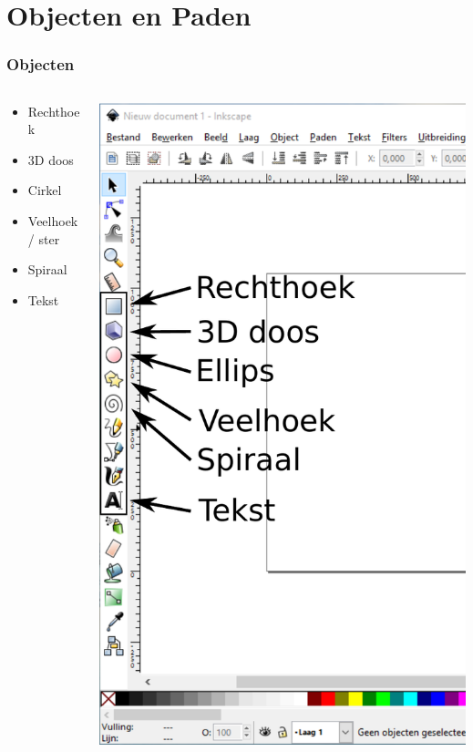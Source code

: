 \documentclass[t]{beamer}
\begin{document}
	\section{Objecten en Paden}
	\begin{frame}
		\frametitle{Objecten}
		\begin{columns}
			\begin{column}[T]{0.5\textwidth}
				\begin{itemize}
					\item Rechthoek
					\item 3D doos
					\item Cirkel
					\item Veelhoek / ster
					\item Spiraal
					\item Tekst
				\end{itemize}
			\end{column}
			\begin{column}[T]{0.5\textwidth}
				\includegraphics[height=0.8\textheight]{fig/inkscape_objecten}
			\end{column}
		\end{columns}
	\end{frame}
\end{document}
